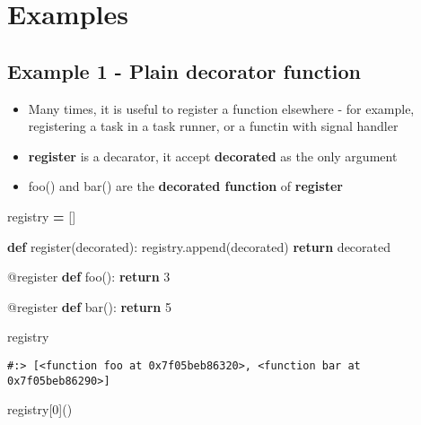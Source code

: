 \documentclass[
]{book}
\newenvironment{Shaded}{\begin{snugshade}}{\end{snugshade}}
\newcommand{\AttributeTok}[1]{\textcolor[rgb]{0.61,0.61,0.61}{#1}}
\newcommand{\ControlFlowTok}[1]{\textcolor[rgb]{0.27,0.27,0.27}{\textbf{#1}}}
\newcommand{\DecValTok}[1]{\textcolor[rgb]{0.06,0.06,0.06}{#1}}
\newcommand{\KeywordTok}[1]{\textcolor[rgb]{0.27,0.27,0.27}{\textbf{#1}}}
\newcommand{\NormalTok}[1]{#1}
\newcommand{\OperatorTok}[1]{\textcolor[rgb]{0.43,0.43,0.43}{\textbf{#1}}}
\providecommand{\tightlist}{%
  \setlength{\itemsep}{0pt}\setlength{\parskip}{0pt}}
\begin{document}
\hypertarget{examples}{%
\section{Examples}\label{examples}}

\hypertarget{example-1---plain-decorator-function}{%
\subsection{Example 1 - Plain decorator function}\label{example-1---plain-decorator-function}}

\begin{itemize}
\tightlist
\item
  Many times, it is useful to register a function elsewhere - for example, registering a task in a task runner, or a functin with signal handler
\item
  \textbf{register} is a decarator, it accept \textbf{decorated} as the only argument
\item
  foo() and bar() are the \textbf{decorated function} of \textbf{register}
\end{itemize}

\begin{Shaded}
\begin{Highlighting}[]
\NormalTok{registry }\OperatorTok{=}\NormalTok{ []}

\KeywordTok{def}\NormalTok{ register(decorated):}
\NormalTok{    registry.append(decorated)}
    \ControlFlowTok{return}\NormalTok{ decorated}

\AttributeTok{@register}
\KeywordTok{def}\NormalTok{ foo():}
    \ControlFlowTok{return} \DecValTok{3}

\AttributeTok{@register}
\KeywordTok{def}\NormalTok{ bar():}
    \ControlFlowTok{return} \DecValTok{5}
\end{Highlighting}
\end{Shaded}

\begin{Shaded}
\begin{Highlighting}[]
\NormalTok{registry}
\end{Highlighting}
\end{Shaded}

\begin{verbatim}
#:> [<function foo at 0x7f05beb86320>, <function bar at 0x7f05beb86290>]
\end{verbatim}

\begin{Shaded}
\begin{Highlighting}[]
\NormalTok{registry[}\DecValTok{0}\NormalTok{]()}
\end{Highlighting}
\end{Shaded}
\end{document}
